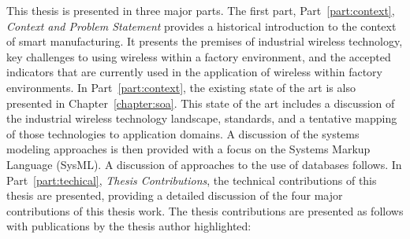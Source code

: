{This thesis is presented in three major parts.  The first part, Part~\ref{part:context}, \textit{Context and Problem Statement} provides a historical introduction to the context of smart manufacturing.  It presents the premises of industrial wireless technology, key challenges to using wireless within a factory environment, and the accepted indicators that are currently used in the application of wireless within factory environments. In Part~\ref{part:context}, the existing state of the art is also presented in Chapter~\ref{chapter:soa}.  This state of the art includes a discussion of the industrial wireless technology landscape, standards, and a tentative mapping of those technologies to application domains.  A discussion of the systems modeling approaches is then provided with a focus on the Systems Markup Language (SysML).  A discussion of approaches to the use of databases follows.  In Part~\ref{part:techical}, \textit{Thesis Contributions}, the technical contributions of this thesis are presented, providing a detailed discussion of the four major contributions of this thesis work.  The thesis contributions are presented as follows with publications by the thesis author highlighted:

%	
%	
%	

}
